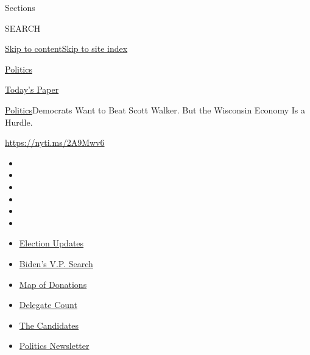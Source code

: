 Sections

SEARCH

\protect\hyperlink{site-content}{Skip to
content}\protect\hyperlink{site-index}{Skip to site index}

\href{https://www.nytimes.com/section/politics}{Politics}

\href{https://myaccount.nytimes.com/auth/login?response_type=cookie\&client_id=vi}{}

\href{https://www.nytimes.com/section/todayspaper}{Today's Paper}

\href{/section/politics}{Politics}\textbar{}Democrats Want to Beat Scott
Walker. But the Wisconsin Economy Is a Hurdle.

\url{https://nyti.ms/2A9Mwv6}

\begin{itemize}
\item
\item
\item
\item
\item
\item
\end{itemize}

\begin{itemize}
\item
  \href{https://www.nytimes.com/2020/07/31/us/elections/biden-vs-trump.html?action=click\&pgtype=Article\&state=default\&region=TOP_BANNER\&context=storylines_menu}{Election
  Updates}
\item
  \href{https://www.nytimes.com/article/biden-vice-president-2020.html?action=click\&pgtype=Article\&state=default\&region=TOP_BANNER\&context=storylines_menu}{Biden's
  V.P. Search}
\item
  \href{https://www.nytimes.com/interactive/2020/07/24/us/politics/trump-biden-campaign-donors.html?action=click\&pgtype=Article\&state=default\&region=TOP_BANNER\&context=storylines_menu}{Map
  of Donations}
\item
  \href{https://www.nytimes.com/interactive/2020/us/elections/delegate-count-primary-results.html?action=click\&pgtype=Article\&state=default\&region=TOP_BANNER\&context=storylines_menu}{Delegate
  Count}
\item
  \href{https://www.nytimes.com/interactive/2019/us/politics/2020-presidential-candidates.html?action=click\&pgtype=Article\&state=default\&region=TOP_BANNER\&context=storylines_menu}{The
  Candidates}
\item
  \href{https://www.nytimes.com/newsletters/politics?action=click\&pgtype=Article\&state=default\&region=TOP_BANNER\&context=storylines_menu}{Politics
  Newsletter}
\end{itemize}

